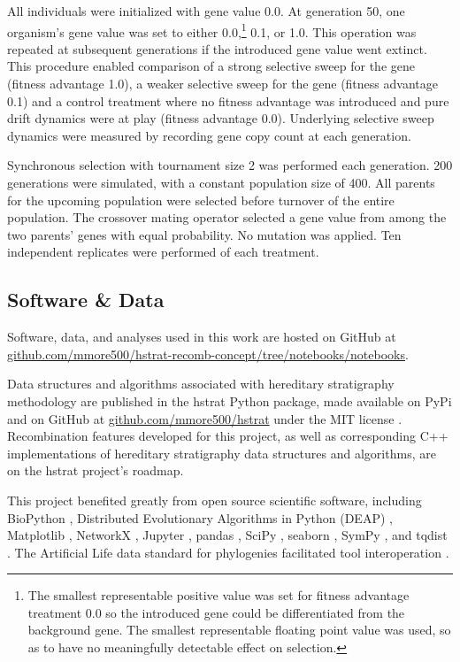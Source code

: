 All individuals were initialized with gene value 0.0.
At generation 50, one organism's gene value was set to either 0.0,\footnote{The smallest representable positive value was set for fitness advantage treatment 0.0 so the introduced gene could be differentiated from the background gene. The smallest representable floating point value was used, so as to have no meaningfully detectable effect on selection.} 0.1, or 1.0.
This operation was repeated at subsequent generations if the introduced gene value went extinct.
This procedure enabled comparison of a strong selective sweep for the gene (fitness advantage 1.0), a weaker selective sweep for the gene (fitness advantage 0.1) and a control treatment where no fitness advantage was introduced and pure drift dynamics were at play (fitness advantage 0.0).
Underlying selective sweep dynamics were measured by recording gene copy count at each generation.

Synchronous selection with tournament size 2 was performed each generation.
200 generations were simulated, with a constant population size of 400.
All parents for the upcoming population were selected before turnover of the entire population.
The crossover mating operator selected a gene value from among the two parents' genes with equal probability.
No mutation was applied.
Ten independent replicates were performed of each treatment.

\subsection{Software \& Data}
\label{sec:software-data}

Software, data, and analyses used in this work are hosted on GitHub at \url{github.com/mmore500/hstrat-recomb-concept/tree/notebooks/notebooks}.

Data structures and algorithms associated with hereditary stratigraphy methodology are published in the hstrat Python package, made available on PyPi and on GitHub at \url{github.com/mmore500/hstrat} under the MIT license \citep{moreno2022hstrat}.
Recombination features developed for this project, as well as corresponding C++ implementations of hereditary stratigraphy data structures and algorithms, are on the hstrat project's roadmap.

This project benefited greatly from open source scientific software, including BioPython \citep{cock2009biopython}, Distributed Evolutionary Algorithms in Python (DEAP) \citep{fortin2012deap}, Matplotlib \citep{hunter2007matplotlib}, NetworkX \citep{hagberg2008networkx}, Jupyter \citep{loizides2016jupyter}, pandas \citep{reback2020pandas,mckinney2010pandas}, SciPy \citep{pauli2020scipy}, seaborn \citep{waskom2021seaborn}, SymPy \citep{meurer2017sympy}, and tqdist \citep{sand2014tqdist}.
The Artificial Life data standard for phylogenies facilitated tool interoperation \citep{lalejini2019data}.
